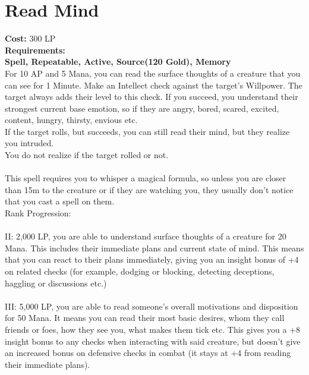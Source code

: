 \section{Read Mind}\label{spell:readMind}
\textbf{Cost:} 300 LP\\
\textbf{Requirements:}\\
\textbf{Spell, Repeatable, Active, Source(120 Gold), Memory}\\
For 10 AP and 5 Mana, you can read the surface thoughts of a creature that you can see for 1 Minute.
Make an Intellect check against the target's Willpower.
The target always adds their level to this check.
If you succeed, you understand their strongest current base emotion, so if they are angry, bored, scared, excited, content, hungry, thirsty, envious etc.\\
If the target rolls, but succeeds, you can still read their mind, but they realize you intruded.\\
You do not realize if the target rolled or not.\\
\\
This spell requires you to whisper a magical formula, so unless you are closer than 15m to the creature or if they are watching you, they usually don't notice that you cast a spell on them.
\\
Rank Progression:\\
\\
II: 2,000 LP, you are able to understand surface thoughts of a creature for 20 Mana.
This includes their immediate plans and current state of mind.
This means that you can react to their plans immediately, giving you an insight bonus of +4 on related checks (for example, dodging or blocking, detecting deceptions, haggling or discussions etc.)\\
\\
III: 5,000 LP, you are able to read someone's overall motivations and disposition for 50 Mana.
It means you can read their most basic desires, whom they call friends or foes, how they see you, what makes them tick etc.
This gives you a +8 insight bonus to any checks when interacting with said creature, but doesn't give an increased bonus on defensive checks in combat (it stays at +4 from reading their immediate plans).\\